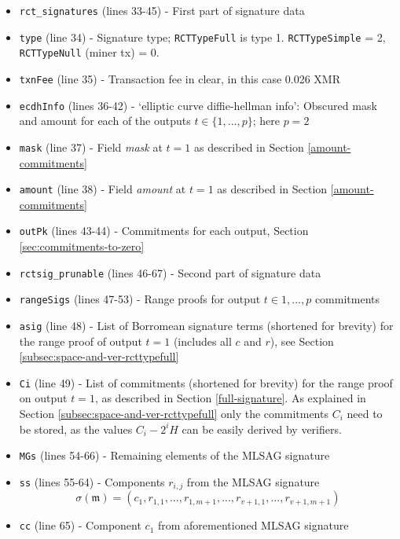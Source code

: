 \begin{appendices}
\begin{itemize}
	\item {\tt rct\_signatures} (lines 33-45) - First part of signature data
	\item {\tt type} (line 34) - Signature type; {\tt RCTTypeFull} is type 1. {\tt RCTTypeSimple} = 2, {\tt RCTTypeNull} (miner tx) = 0.
	\item {\tt txnFee} (line 35) - Transaction fee in clear, in this case 0.026 XMR
	\item {\tt ecdhInfo} (lines 36-42) - ‘elliptic curve diffie-hellman info’: Obscured mask and amount for each of the outputs $t \in \{1, ..., p\}$; here $p = 2$
	\item {\tt mask} (line 37) - Field {\sl mask} at $t = 1$ as described in Section \ref{amount-commitments}
    \item {\tt amount} (line 38) - Field {\sl amount} at $t = 1$ as described in Section \ref{amount-commitments}
    \item {\tt outPk} (lines 43-44) - Commitments for each output, Section \ref{sec:commitments-to-zero}
    
    \item {\tt rctsig\_prunable} (lines 46-67) - Second part of signature data
    \item {\tt rangeSigs} (lines 47-53) - Range proofs for output $t \in {1, ..., p}$ commitments 
    \item {\tt asig} (line 48) - List of Borromean signature terms (shortened for brevity) for the range proof of output $t = 1$ (includes all $c$ and $r$), see Section \ref{subsec:space-and-ver-rcttypefull} 
    \item {\tt Ci} (line 49) -  List of commitments (shortened for brevity) for the range proof on output $t = 1$, as described in Section \ref{full-signature}. As explained in Section \ref{subsec:space-and-ver-rcttypefull} only the commitments $C_i$ need to be stored, as the values $C_i -2^i H$ can be easily derived by verifiers. 
    \item {\tt MGs} (lines 54-66) - Remaining elements of the MLSAG signature
    \item {\tt ss} (lines 55-64) - Components \(r_{i,j}\) from the MLSAG signature
      \[\sigma(\mathfrak{m}) = (c_1, r_{1, 1}, ..., r_{1, m+1}, ..., r_{v+1, 1}, ..., r_{v+1, m+1}) \]
    \item {\tt cc} (line 65) - Component \(c_1\) from aforementioned MLSAG signature
	
\end{itemize}






\end{appendices}
